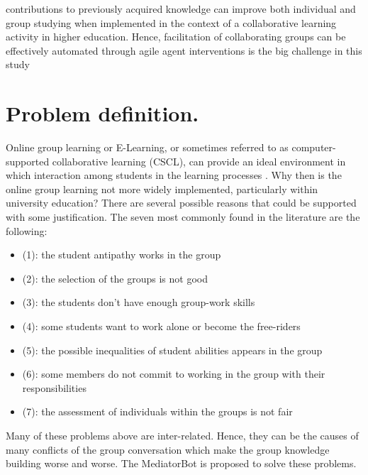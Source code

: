 \documentclass[letterpaper%
, twoside%
, 12pt%
,these%
, english%
,creativecommons,hyperref, withAlgo2e %
]{thETS}
\begin{document}
\begin{introduction}
contributions to previously acquired knowledge can improve both individual and group studying when implemented in the context of a collaborative learning activity in higher education. Hence, facilitation of collaborating groups can be effectively automated through agile agent interventions is the big challenge in this study
\end{introduction}



\chapter{Problem definition.}
Online group learning or E-Learning, or sometimes referred to as computer-supported collaborative learning (CSCL), can provide an ideal environment in which interaction among students in the learning processes \cite{Lipponena}\cite{Lipponenb}. Why then is the online group learning not more widely implemented, particularly within university education? There are several possible reasons that could be supported with some justification. The seven most commonly found in the literature are the following:
\begin{itemize}
	\item (1): the student antipathy works in the group
	\item (2): the selection of the groups is not good
	\item (3): the students don't have enough group-work skills
	\item (4): some students want to work alone or become the free-riders
	\item (5): the possible inequalities of student abilities appears in the group
	\item (6): some members do not commit to working in the group with their responsibilities
	\item (7): the assessment of individuals within the groups is not fair
\end{itemize}
Many of these problems above are inter-related. Hence, they can be the causes of many conflicts of the group conversation which make the group knowledge building worse and worse. The MediatorBot is proposed to solve these problems.
\end{document}
